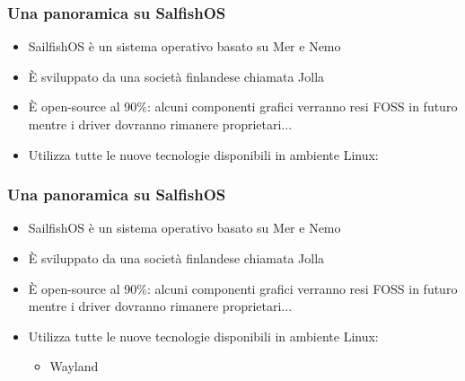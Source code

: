 \documentclass[12pt]{beamer}
\begin{document}
\begin{frame}
\frametitle{Una panoramica su SalfishOS}
\begin{itemize}
\item SailfishOS è un sistema operativo basato su Mer e Nemo
\item È sviluppato da una società finlandese chiamata Jolla
\item È open-source al 90\%: alcuni componenti grafici verranno resi FOSS in futuro mentre i driver dovranno rimanere proprietari...
\item Utilizza tutte le nuove tecnologie disponibili in ambiente Linux:
\end{itemize}
\end{frame}

\begin{frame}
\frametitle{Una panoramica su SalfishOS}
\begin{itemize}
\item SailfishOS è un sistema operativo basato su Mer e Nemo
\item È sviluppato da una società finlandese chiamata Jolla
\item È open-source al 90\%: alcuni componenti grafici verranno resi FOSS in futuro mentre i driver dovranno rimanere proprietari...
\item Utilizza tutte le nuove tecnologie disponibili in ambiente Linux:
\begin{itemize}
\item Wayland
\end{itemize}
\end{itemize}
\end{frame}
\end{document}
